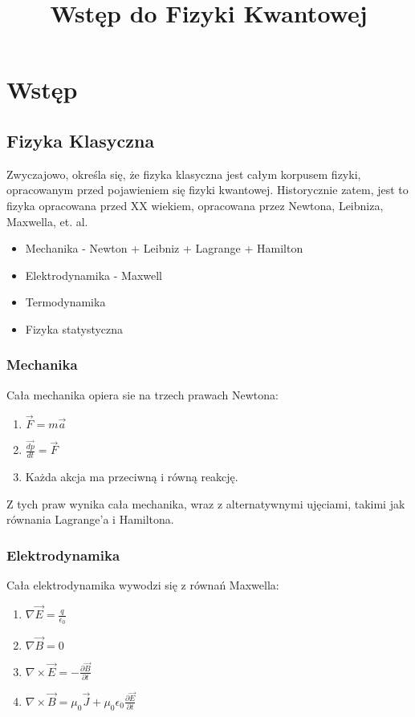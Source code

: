 \documentclass{../notatki}
\title{Wstęp do Fizyki Kwantowej}
\begin{document}
\section{Wstęp}

\subsection{Fizyka Klasyczna}

Zwyczajowo, określa się, że fizyka klasyczna jest całym korpusem fizyki,
opracowanym przed pojawieniem się fizyki kwantowej. Historycznie zatem,
jest to fizyka opracowana przed XX wiekiem, opracowana przez Newtona, Leibniza,
Maxwella, et. al.

\begin{itemize}
  \item Mechanika - Newton + Leibniz + Lagrange + Hamilton
  \item Elektrodynamika - Maxwell
  \item Termodynamika
  \item Fizyka statystyczna
\end{itemize}

\subsubsection{Mechanika}

Cała mechanika opiera sie na trzech prawach Newtona:
\begin{enumerate}
  \item $
    \vec{F} = m\vec{a}
    $
  \item $
    \frac{\vec{dp}}{dt} = \vec{F}
    $
  \item Każda akcja ma przeciwną i równą reakcję.
\end{enumerate}

Z tych praw wynika cała mechanika, wraz z alternatywnymi ujęciami, takimi jak
równania Lagrange'a i Hamiltona.

\subsubsection{Elektrodynamika}

Cała elektrodynamika wywodzi się z równań Maxwella:
\begin{enumerate}
  \item $\nabla \vec{E} = \frac{q}{\epsilon_0}$
  \item $\nabla \vec{B} = 0$
  \item $\nabla \times \vec{E} = -\frac{\partial \vec{B}}{\partial t}$
  \item $\nabla \times \vec{B} = \mu_0 \vec{J} + \mu_0 \epsilon_0
    \frac{\partial \vec{E}}{\partial t}$
\end{enumerate}
\end{document}
